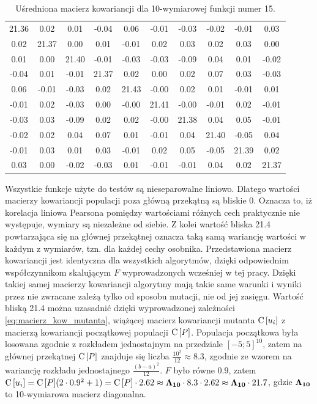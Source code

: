 \documentclass[a4paper,onecolumn,oneside,12pt,wide,floatssmall]{mwrep}
\def\C{{\rm C}\,}
\theoremstyle{definition}
\theoremstyle{plain}%
\theoremstyle{remark}
\begin{document}
\begin{table}[H]
\centering
\begin{tabular}{ c c c c c c c c c c }
21.36 & 0.02 & 0.01 & -0.04 & 0.06 & -0.01 & -0.03 & -0.02 & -0.01 & 0.03 \\
0.02 & 21.37 & 0.00 & 0.01 & -0.01 & 0.02 & 0.03 & 0.02 & 0.03 & 0.00 \\
0.01 & 0.00 & 21.40 & -0.01 & -0.03 & -0.03 & -0.09 & 0.04 & 0.01 & -0.02 \\
-0.04 & 0.01 & -0.01 & 21.37 & 0.02 & 0.00 & 0.02 & 0.07 & 0.03 & -0.03 \\
0.06 & -0.01 & -0.03 & 0.02 & 21.43 & -0.00 & 0.02 & 0.01 & -0.01 & 0.01 \\
-0.01 & 0.02 & -0.03 & 0.00 & -0.00 & 21.41 & -0.00 & -0.01 & 0.02 & -0.01 \\
-0.03 & 0.03 & -0.09 & 0.02 & 0.02 & -0.00 & 21.38 & 0.04 & 0.05 & -0.01 \\
-0.02 & 0.02 & 0.04 & 0.07 & 0.01 & -0.01 & 0.04 & 21.40 & -0.05 & 0.04 \\
-0.01 & 0.03 & 0.01 & 0.03 & -0.01 &  0.02 & 0.05 & -0.05 & 21.39 & 0.02 \\
0.03 & 0.00 & -0.02 & -0.03 & 0.01 & -0.01 & -0.01 &  0.04 & 0.02 & 21.37 \\
\end{tabular}
\caption{Uśredniona macierz kowariancji dla 10-wymiarowej funkcji numer 15.}
\label{table:cov_matrix}
\end{table}

Wszystkie funkcje użyte do testów są nieseparowalne liniowo.
Dlatego wartości macierzy kowariancji populacji poza główną przekątną są bliskie 0. Oznacza to,
iż korelacja liniowa Pearsona pomiędzy wartościami różnych cech praktycznie nie występuje, wymiary
są niezależne od siebie. Z kolei wartość bliska 21.4 powtarzająca się na głównej przekątnej 
oznacza taką samą wariancję wartości w każdym z wymiarów, tzn. dla każdej cechy osobnika.
Przedstawiona macierz kowariancji jest identyczna dla wszystkich algorytmów, 
dzięki odpowiednim współczynnikom skalującym
$F$ wyprowadzonych wcześniej w tej pracy. Dzięki takiej samej macierzy kowariancji algorytmy
mają takie same warunki i wyniki przez nie zwracane zależą tylko od sposobu mutacji, nie od jej
zasięgu. 
Wartość bliską 21.4 można uzasadnić dzięki wyprowadzonej zależności \eqref{eq:macierz_kow_mutanta},
wiążącej macierz kowariancji mutanta $\C[u_i]$
z macierzą kowariancji początkowej populacji $\C[P]$. Populacja początkowa była losowana zgodnie z 
rozkładem jednostajnym na przedziale $[-5;5]^{10}$, zatem na głównej przekątnej $\C[P]$
znajduje się liczba $\frac{10^2}{12} \approx 8.3$, zgodnie ze wzorem na wariancję rozkładu jednostajnego 
$\frac{(b - a)^2}{12}$. $F$ było równe 0.9, zatem 
$\C[u_i] = \C[P](2 \cdot 0.9^2 + 1) = \C[P] \cdot 2.62 \approx \bold{\Lambda_{10}} \cdot 8.3 \cdot 2.62 \approx \bold{\Lambda_{10}} \cdot 21.7$, gdzie $\bold{\Lambda_{10}}$
to 10-wymiarowa macierz diagonalna. 
\end{document}
